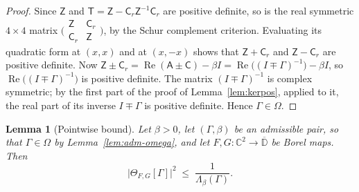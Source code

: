 \documentclass[11pt,reqno]{amsart}
\newtheorem{lemma}[theorem]{Lemma}
\theoremstyle{definition}
\numberwithin{equation}{section}
\newcommand{\C}{\mathbb{C}}
\newcommand{\D}{\mathbb{D}}
\newcommand{\Om}{\Omega}
\newcommand{\sA}{\mathsf{A}}
\newcommand{\sC}{\mathsf{C}}
\newcommand{\sZ}{\mathsf{Z}}
\newcommand{\sT}{\mathsf{T}}
\DeclareMathOperator{\RePart}{Re}
\begin{document}
\begin{proof}
Since $\sZ$ and $\sT=\sZ-\sC_r\sZ^{-1}\sC_r$ are positive definite, so is the real symmetric $4\times4$ matrix $\bigl(\begin{smallmatrix}\sZ&\sC_r\\ \sC_r&\sZ\end{smallmatrix}\bigr)$, by the Schur complement criterion. Evaluating its quadratic form at $(x,x)$ and at $(x,-x)$ shows that $\sZ+\sC_r$ and $\sZ-\sC_r$ are positive definite. Now $\sZ\pm\sC_r=\RePart(\sA\pm\sC)-\beta I=\RePart\bigl((I\mp\Gamma)^{-1}\bigr)-\beta I$, so $\RePart\bigl((I\mp\Gamma)^{-1}\bigr)$ is positive definite. The matrix $(I\mp\Gamma)^{-1}$ is complex symmetric; by the first part of the proof of Lemma~\ref{lem:kerpos}, applied to it, the real part of its inverse $I\mp\Gamma$ is positive definite. Hence $\Gamma\in\Om$.
\end{proof}

\begin{lemma}[Pointwise bound]\label{lem:schur}
Let $\beta>0$, let $(\Gamma,\beta)$ be an admissible pair, so that $\Gamma\in\Om$ by Lemma~\ref{lem:adm-omega}, and let $F,G:\C^2\to\overline{\D}$ be Borel maps. Then
\[
  \bigl|\Theta_{F,G}[\Gamma]\bigr|^2\;\le\;\frac{1}{\Lambda_\beta(\Gamma)} .
\]
\end{lemma}
\end{document}
